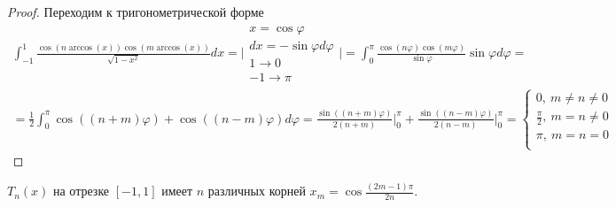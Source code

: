 \begin{proof}
  Переходим к тригонометрической форме
  \begin{multline*}
    \int_{-1}^{1}\frac{\cos(n\arccos(x))\cos(m\arccos(x))}{\sqrt{1-x^2}}dx
    =\Big|\substack{x=\cos\varphi \\
      dx = -\sin\varphi d\varphi\\
      1\rightarrow0 \\
      -1\rightarrow\pi
    }\Big|=\int_{0}^{\pi}\frac{\cos(n\varphi)\cos(m\varphi)}{\sin\varphi}\sin\varphi d\varphi = \\
    = \frac{1}{2}\int_0^{\pi}\cos((n+m)\varphi)+\cos((n-m)\varphi)d\varphi = \frac{\sin((n+m)\varphi)}{2(n+m)}\Big|_0^{\pi}+\frac{\sin((n-m)\varphi)}{2(n-m)}\Big|_0^{\pi}=\begin{cases}
      0,\ m\neq n\neq0         \\
      \frac{\pi}{2},\ m=n\neq0 \\
      \pi,\ m=n=0              \\
    \end{cases}
  \end{multline*}
\end{proof}


\def\SingleImageScale {1.3}

\begin{theorem}
  $T_n(x)$ на отрезке $[-1,1]$ имеет $n$ различных корней $x_m=\cos\frac{(2m-1)\pi}{2n}$.
\end{theorem}

